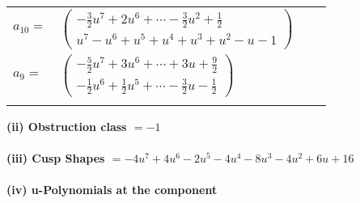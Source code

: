 \documentclass[1p]{elsarticle_modified}
\theoremstyle{definition}
\begin{document}
\begin{tabular}{m{7pt} m{180pt} m{7pt} m{180pt} }
\flushright $a_{10}=$&$\begin{pmatrix}-\frac{3}{2} u^7+2 u^6+\cdots-\frac{3}{2} u^2+\frac{1}{2}\\u^7- u^6+u^5+u^4+u^3+u^2- u-1\end{pmatrix}$ \\
\flushright $a_{9}=$&$\begin{pmatrix}-\frac{5}{2} u^7+3 u^6+\cdots+3 u+\frac{9}{2}\\-\frac{1}{2} u^6+\frac{1}{2} u^5+\cdots-\frac{3}{2} u-\frac{1}{2}\end{pmatrix}$\\&\end{tabular}
\flushleft \textbf{(ii) Obstruction class $= -1$}\\~\\
\flushleft \textbf{(iii) Cusp Shapes $= -4 u^7+4 u^6-2 u^5-4 u^4-8 u^3-4 u^2+6 u+16$}\\~\\
\newpage\renewcommand{\arraystretch}{1}
\flushleft \textbf{(iv) u-Polynomials at the component}\newline \\
\end{document}
